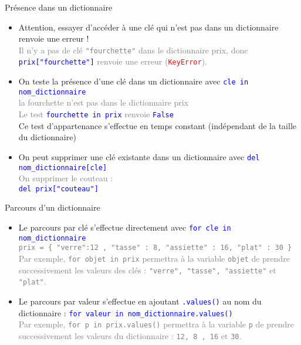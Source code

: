 \documentclass[10pt]{beamer}
\begin{document}
\begin{frame}{\Ctitle}{\stitle}
	\begin{block}{Présence dans un dictionnaire}
		\begin{itemize}
			\item<1-> Attention, essayer d'accéder à une clé qui n'est pas dans un dictionnaire renvoie une erreur !\\
				\onslide<2->\textcolor{gray}{\footnotesize Il n'y a pas de clé {\tt "fourchette"} dans le dictionnaire prix, donc \textcolor{blue}{\tt prix["fourchette"]} renvoie une erreur ({\tt \textcolor{red}{KeyError}}).}
			\item<3-> On teste la présence d'une clé dans un dictionnaire avec \textcolor{blue}{\tt cle in nom\_dictionnaire}\\
				\onslide<4->\textcolor{gray}{\footnotesize la fourchette n'est pas dans le dictionnaire prix \\
					Le test \textcolor{blue}{\tt fourchette in prix} renvoie \textcolor{blue}{\tt False}\\}
				\onslide<5->\textcolor{BrickRed}{\footnotesize \important} \textcolor{BrickRed}{Ce test d'appartenance s'effectue en temps constant (indépendant de la taille du dictionnaire)}
			\item<5-> On peut supprimer une clé existante dans un dictionnaire avec \textcolor{blue}{\tt del nom\_dictionnaire[cle]}\\
				\onslide<6->\textcolor{gray}{\footnotesize On supprimer le couteau : \\
					\textcolor{blue}{\tt del prix["couteau"]}
				}
		\end{itemize}
	\end{block}
\end{frame}


\begin{frame}{\Ctitle}{\stitle}
	\begin{alertblock}{Parcours d'un dictionnaire}
		\begin{itemize}
			\item<1-> Le parcours par clé s'effectue directement avec \textcolor{blue}{\tt for cle in nom\_dictionnaire}\\
				\onslide<2->\textcolor{gray}{{\footnotesize \tt prix = \{ "verre":12 , "tasse" : 8, "assiette" : 16, "plat" : 30 \} } \\
				Par exemple, {\tt for objet in prix} permettra à la variable {\tt objet} de prendre successivement les valeurs des clés : {\tt "verre", "tasse", "assiette"} et {\tt "plat"}.}
			\item<3-> Le parcours par valeur s'effectue en ajoutant \textcolor{blue}{\tt .values()} au nom du dictionnaire : \textcolor{blue}{\tt for valeur in nom\_dictionnaire.values() \\}
				\onslide<4->\textcolor{gray}{\footnotesize
				Par exemple, {\tt for p in prix.values()} permettra à la variable {\tt p} de prendre successivement les valeurs du dictionnaire : {\tt 12, 8 , 16} et {\tt 30}.
				}
		\end{itemize}
	\end{alertblock}
\end{frame}
\end{document}
